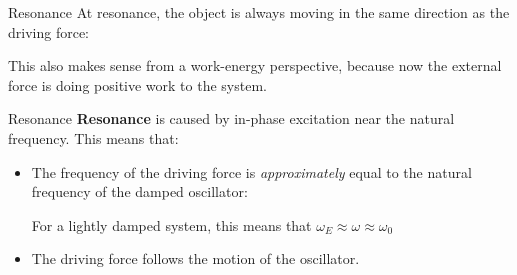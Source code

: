 \documentclass[12pt,compress,aspectratio=169]{beamer}
\begin{document}
\begin{frame}{Resonance}
  At resonance, the object is always moving in the same direction as the
  driving force:

  \vspace{-.3in}{\large
    \begin{align*}
      v(t)&=A\omega_E\cos(\omega_E t)\\
      F_E(t)&=F\cos(\omega_E t)
    \end{align*}
  }

  \vspace{-.2in}This also makes sense from a work-energy perspective, because
  now the external force is doing positive work to the system.
\end{frame}



\begin{frame}{Resonance}
  \textbf{Resonance} is caused by in-phase excitation near the natural
  frequency. This means that:
  \begin{itemize}
  \item The frequency of the driving force is \emph{approximately} equal to the
    natural frequency of the damped oscillator:


    For a lightly damped system, this means that
    $\omega_E\approx\omega\approx\omega_0$
  \item The driving force follows the motion of the oscillator.
  \end{itemize}
\end{frame}
\end{document}
